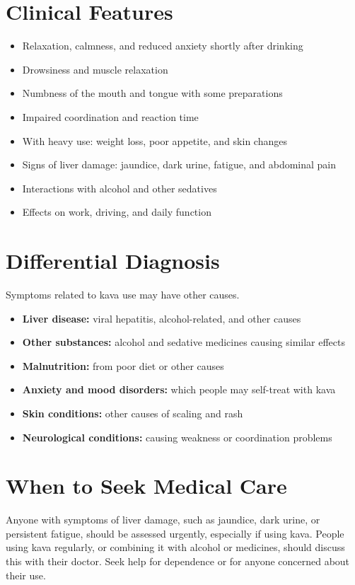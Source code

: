 \section*{Clinical Features}
\begin{itemize}
    \item Relaxation, calmness, and reduced anxiety shortly after drinking
    \item Drowsiness and muscle relaxation
    \item Numbness of the mouth and tongue with some preparations
    \item Impaired coordination and reaction time
    \item With heavy use: weight loss, poor appetite, and skin changes
    \item Signs of liver damage: jaundice, dark urine, fatigue, and abdominal pain
    \item Interactions with alcohol and other sedatives
    \item Effects on work, driving, and daily function
\end{itemize}

\section*{Differential Diagnosis}
Symptoms related to kava use may have other causes.
\begin{itemize}
    \item \textbf{Liver disease:} viral hepatitis, alcohol-related, and other causes
    \item \textbf{Other substances:} alcohol and sedative medicines causing similar effects
    \item \textbf{Malnutrition:} from poor diet or other causes
    \item \textbf{Anxiety and mood disorders:} which people may self-treat with kava
    \item \textbf{Skin conditions:} other causes of scaling and rash
    \item \textbf{Neurological conditions:} causing weakness or coordination problems
\end{itemize}

\section*{When to Seek Medical Care}
Anyone with symptoms of liver damage, such as jaundice, dark urine, or persistent fatigue, should be assessed urgently, especially if using kava. People using kava regularly, or combining it with alcohol or medicines, should discuss this with their doctor. Seek help for dependence or for anyone concerned about their use.

